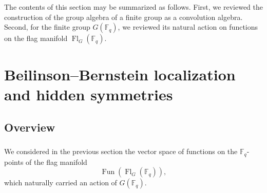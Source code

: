 \documentclass[10pt]{amsart}
\newcommand{\sB}{\on{Fl}_G}
\newcommand{\on}{\operatorname}
\renewcommand{\mod}{\on{-mod}}
\newcommand{\Fq}{\mathbb{F}_q}
\newcommand{\Fun}{\on{Fun}}
\theoremstyle{remark}
\numberwithin{equation}{section}
\renewcommand{\mod}{\operatorname{-mod}}
\begin{document}
	
	
	\subsubsection{} The contents of this section may be summarized as follows. 
	First, we reviewed the construction of the group algebra of a finite group 
	as a convolution algebra. Second, for the finite group $G(\Fq)$, we 
	reviewed its natural action on functions on the flag manifold $\sB(\Fq)$. 
	
	
	
	
	

	
	
	
	
	
	

	
	
	
	
	
	
	
	
	
	
	
	
	\section{Beilinson--Bernstein localization and hidden symmetries}
	\label{s:bbloc}
	
	\subsection{Overview} 
		\label{s:overview3}
	\subsubsection{} We considered in the previous section the 
	vector space of functions on the $\Fq$-points of the flag manifold
	\begin{equation} \label{e:funflgs}
	\Fun(\sB(\Fq)), 
	\end{equation}
	which naturally carried an action of $G(\Fq)$. 
	
\end{document}
